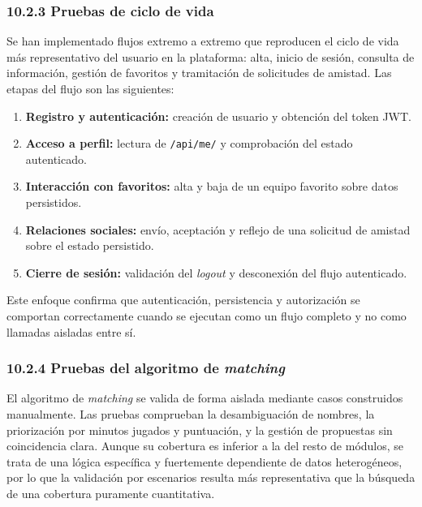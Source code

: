\subsubsection{10.2.3 Pruebas de ciclo de vida}
\label{subsec:pruebas-e2e}

Se han implementado flujos extremo a extremo que reproducen el ciclo de vida más representativo del usuario en la plataforma: alta, inicio de sesión, consulta de información, gestión de favoritos y tramitación de solicitudes de amistad. Las etapas del flujo son las siguientes:

\begin{enumerate}
    \item \textbf{Registro y autenticación:} creación de usuario y obtención del token JWT.
    \item \textbf{Acceso a perfil:} lectura de \texttt{/api/me/} y comprobación del estado autenticado.
    \item \textbf{Interacción con favoritos:} alta y baja de un equipo favorito sobre datos persistidos.
    \item \textbf{Relaciones sociales:} envío, aceptación y reflejo de una solicitud de amistad sobre el estado persistido.
    \item \textbf{Cierre de sesión:} validación del \textit{logout} y desconexión del flujo autenticado.
\end{enumerate}

Este enfoque confirma que autenticación, persistencia y autorización se comportan correctamente cuando se ejecutan como un flujo completo y no como llamadas aisladas entre sí.


\subsubsection{10.2.4 Pruebas del algoritmo de \textit{matching}}
\label{subsec:pruebas-matching}

El algoritmo de \textit{matching} se valida de forma aislada mediante casos construidos manualmente. Las pruebas comprueban la desambiguación de nombres, la priorización por minutos jugados y puntuación, y la gestión de propuestas sin coincidencia clara. Aunque su cobertura es inferior a la del resto de módulos, se trata de una lógica específica y fuertemente dependiente de datos heterogéneos, por lo que la validación por escenarios resulta más representativa que la búsqueda de una cobertura puramente cuantitativa.


